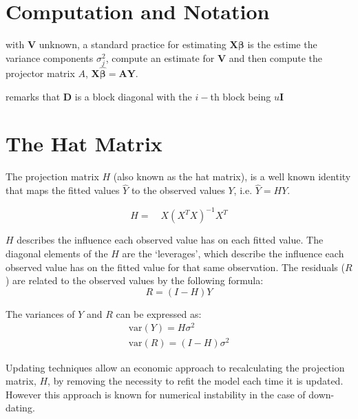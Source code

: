 \documentclass[12pt, a4paper]{article}
\begin{document}
\section{Computation and Notation } %
with $\boldsymbol{V}$ unknown, a standard practice for estimating $\boldsymbol{X \beta}$ is the estime the variance components $\sigma^2_j$,
compute an estimate for $\boldsymbol{V}$ and then compute the projector matrix $A$, $\boldsymbol{X \hat{\beta}}  = \boldsymbol{AY}$.




\citet{zewotir} remarks that $\boldsymbol{D}$ is a block diagonal with the $i-$th block being $u \boldsymbol{I}$






\section{The Hat Matrix} %

The projection matrix $H$ (also known as the hat matrix), is a
well known identity that maps the fitted values $\hat{Y}$ to the
observed values $Y$, i.e. $\hat{Y} = HY$.

\begin{equation}
H =\quad X(X^{T}X)^{-1}X^{T}
\end{equation}

$H$ describes the influence each observed value has on each fitted
value. The diagonal elements of the $H$ are the `leverages', which
describe the influence each observed value has on the fitted value
for that same observation. The residuals ($R$) are related to the
observed values by the following formula:
\begin{equation}
R = (I-H)Y
\end{equation}

The variances of $Y$ and $R$ can be expressed as:
\begin{eqnarray}
\mbox{var}(Y) = H\sigma^{2} \nonumber\\
\mbox{var}(R) = (I-H)\sigma^{2}
\end{eqnarray}

Updating techniques allow an economic approach to recalculating
the projection matrix, $H$, by removing the necessity to refit the
model each time it is updated. However this approach is known for
numerical instability in the case of down-dating.
\end{document}
